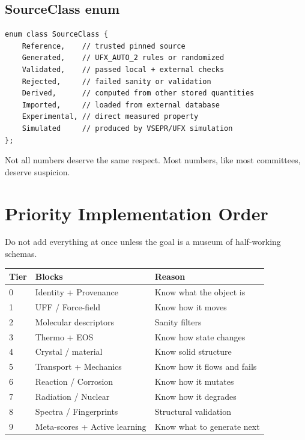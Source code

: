 \documentclass[11pt, a4paper]{article}
\begin{document}
\subsection{SourceClass enum}

\begin{lstlisting}
enum class SourceClass {
    Reference,    // trusted pinned source
    Generated,    // UFX_AUTO_2 rules or randomized
    Validated,    // passed local + external checks
    Rejected,     // failed sanity or validation
    Derived,      // computed from other stored quantities
    Imported,     // loaded from external database
    Experimental, // direct measured property
    Simulated     // produced by VSEPR/UFX simulation
};
\end{lstlisting}

Not all numbers deserve the same respect. Most numbers, like most committees, deserve suspicion.

\section{Priority Implementation Order}

Do not add everything at once unless the goal is a museum of half-working schemas.

\begin{tierbox}
\begin{tabular}{lll}
\toprule
\textbf{Tier} & \textbf{Blocks} & \textbf{Reason} \\
\midrule
0 & Identity + Provenance     & Know what the object is \\
1 & UFF / Force-field         & Know how it moves \\
2 & Molecular descriptors     & Sanity filters \\
3 & Thermo + EOS              & Know how state changes \\
4 & Crystal / material        & Know solid structure \\
5 & Transport + Mechanics     & Know how it flows and fails \\
6 & Reaction / Corrosion      & Know how it mutates \\
7 & Radiation / Nuclear       & Know how it degrades \\
8 & Spectra / Fingerprints    & Structural validation \\
9 & Meta-scores + Active learning & Know what to generate next \\
\bottomrule
\end{tabular}
\end{tierbox}
\end{document}
